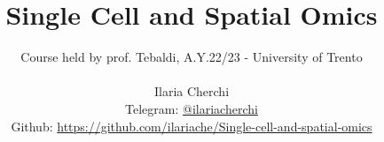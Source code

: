 
\title{\Huge\textbf{Single Cell and Spatial Omics}}
\author{
 Course held by prof. Tebaldi, A.Y.22/23 - University of Trento\\
  \\
  Ilaria Cherchi\\
  \small Telegram: \href{https://t.me/ilariacherchi}{@ilariacherchi} \\[3pt]
\small Github: \href{https://github.com/ilariache/Single-cell-and-spatial-omics}{https://github.com/ilariache/Single-cell-and-spatial-omics}\\}



\maketitle
\tableofcontents

    
    
    
    
    
    

